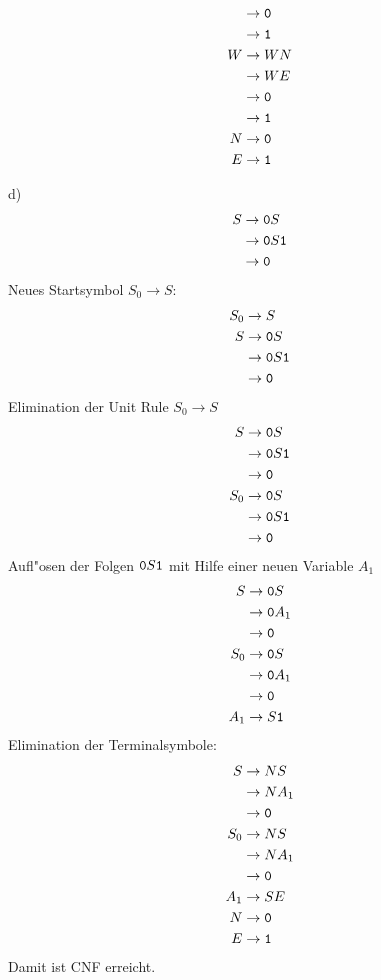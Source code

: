 \begin{loesung}
\begin{teilaufgaben}
\begin{align*}
 &\rightarrow {\tt 0}\\
 &\rightarrow {\tt 1}\\
W&\rightarrow WN\\
 &\rightarrow WE\\
 &\rightarrow {\tt 0}\\
 &\rightarrow {\tt 1}\\
N&\rightarrow {\tt 0}\\
E&\rightarrow {\tt 1}\\
\end{align*}
\item[d)]
\begin{align*}
S&\rightarrow {\tt 0}S\\
 &\rightarrow {\tt 0}S{\tt 1}\\
 &\rightarrow {\tt 0}
\end{align*}
Neues Startsymbol $S_0\to S$:
\begin{align*}
S_0&\rightarrow S\\
S&\rightarrow {\tt 0}S\\
 &\rightarrow {\tt 0}S{\tt 1}\\
 &\rightarrow {\tt 0}
\end{align*}
Elimination der Unit Rule $S_0\to S$
\begin{align*}
S&\rightarrow {\tt 0}S\\
 &\rightarrow {\tt 0}S{\tt 1}\\
 &\rightarrow {\tt 0}\\
S_0&\rightarrow {\tt 0}S\\
 &\rightarrow {\tt 0}S{\tt 1}\\
 &\rightarrow {\tt 0}
\end{align*}
Aufl"osen der Folgen ${\tt 0}S{\tt 1}$ mit Hilfe einer neuen Variable
$A_1$
\begin{align*}
S&\rightarrow {\tt 0}S\\
 &\rightarrow {\tt 0}A_1\\
 &\rightarrow {\tt 0}\\
S_0&\rightarrow {\tt 0}S\\
 &\rightarrow {\tt 0}A_1\\
 &\rightarrow {\tt 0}\\
A_1&\rightarrow S{\tt 1}
\end{align*}
Elimination der Terminalsymbole:
\begin{align*}
S&\rightarrow NS\\
 &\rightarrow NA_1\\
 &\rightarrow {\tt 0}\\
S_0&\rightarrow NS\\
 &\rightarrow NA_1\\
 &\rightarrow {\tt 0}\\
A_1&\rightarrow SE\\
N&\rightarrow {\tt 0}\\
E&\rightarrow {\tt 1}\\
\end{align*}
Damit ist CNF erreicht.
\qedhere
\end{teilaufgaben}
\end{loesung}
